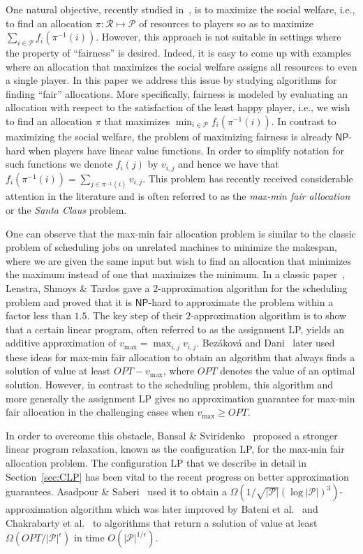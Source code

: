 \documentclass{llncs}
\newcommand{\res}{\ensuremath{\mathcal{R}}\xspace}
\newcommand{\players}{\ensuremath{\mathcal{P}}\xspace}
\begin{document}
One natural objective, recently studied
in~\cite{DS06,Feige06,FV06,Vondrak08}, is to maximize the social
welfare, i.e., to find an allocation $\pi: \res \mapsto \players$ of
resources to players so as to maximize $\sum_{i\in \players} f_i(
\pi^{-1}(i))$.  However, this approach is not suitable in settings
where the property of ``fairness'' is desired.  Indeed, it is easy to
come up with examples where an allocation that maximizes the social
welfare assigns all resources to even a single player. In this
paper we address this issue by studying algorithms for finding
``fair'' allocations. More specifically, fairness is modeled by
evaluating an allocation with respect to the satisfaction of the least
happy player, i.e., we wish to find an allocation $\pi$ that maximizes
$\min_{i\in \players} f_i(\pi^{-1}(i))$. In contrast to maximizing the
social welfare, the problem of maximizing fairness is already
$\mathsf{NP}$-hard when players have linear value functions. In order
to simplify notation for such functions we denote $f_i({j})$ by
$v_{i,j}$ and hence we have that $f_i(\pi^{-1}(i)) = \sum_{j\in
  \pi^{-1}(i)} v_{i,j}$. This problem has recently received
considerable attention in the literature and is often referred to as
the \emph{max-min fair allocation} or the \emph{Santa Claus} problem.

One can observe that the max-min fair allocation problem is similar to
the classic problem of scheduling jobs on unrelated machines to
minimize the makespan, where we are given the same input but wish to
find an allocation that minimizes the maximum instead of one that
maximizes the minimum. In a classic paper~\cite{LST90}, Lenstra,
Shmoys \& Tardos gave a $2$-approximation algorithm for the scheduling
problem and proved that it is $\mathsf{NP}$-hard to approximate the
problem within a factor less than $1.5$. The key step of their
$2$-approximation algorithm is to show that a certain linear program,
often referred to as the assignment LP, yields an additive
approximation of $v_{\max} = \max_{i,j} v_{i,j}$.  Bez\'akov\'a and
Dani~\cite{BD05} later used these ideas for max-min fair allocation to
obtain an algorithm that always finds a solution of value at least
$OPT-v_{\max}$, where $OPT$ denotes the value of an optimal
solution. However, in contrast to the scheduling problem, this
algorithm and more generally the assignment LP gives no approximation
guarantee for max-min fair allocation in the challenging cases when
$v_{\max} \geq OPT$.

In order to overcome this obstacle, Bansal \& Sviridenko~\cite{BS06}
proposed a stronger linear program relaxation, known as the
configuration LP, for the max-min fair allocation problem. The
configuration LP that we describe in detail in Section~\ref{sec:CLP}
has been vital to the recent progress on better approximation
guarantees.  Asadpour \& Saberi~\cite{AS07} used it to obtain a
$\Omega(1/\sqrt{|\players|} (\log |\players|)^3)$-approximation
algorithm which was later improved by Bateni et al.~\cite{Bateni09}
and Chakrabarty et al.~\cite{Chakrabarty09} to algorithms that return
a solution of value at least $\Omega(OPT/|\players|^\epsilon)$ in time
$O(|\players|^{1/\epsilon})$.
\end{document}
